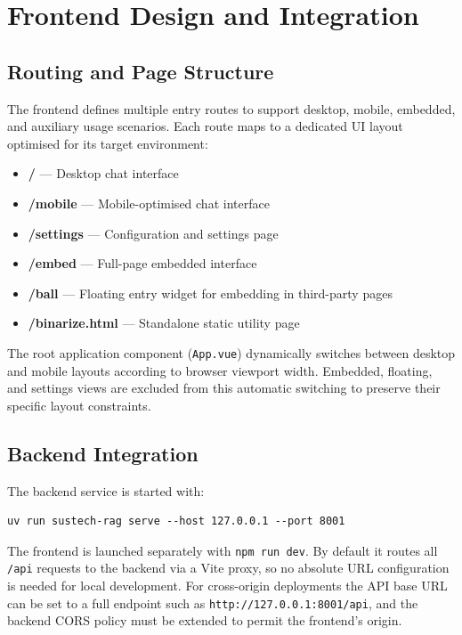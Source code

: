 \chapter{Frontend Design and Integration}
\section{Routing and Page Structure}

The frontend defines multiple entry routes to support desktop, mobile, embedded, and auxiliary usage scenarios. Each route maps to a dedicated UI layout optimised for its target environment:

\begin{itemize}
    \item \textbf{/} — Desktop chat interface
    \item \textbf{/mobile} — Mobile-optimised chat interface
    \item \textbf{/settings} — Configuration and settings page
    \item \textbf{/embed} — Full-page embedded interface
    \item \textbf{/ball} — Floating entry widget for embedding in third-party pages
    \item \textbf{/binarize.html} — Standalone static utility page
\end{itemize}

The root application component (\texttt{App.vue}) dynamically switches between desktop and mobile layouts according to browser viewport width. Embedded, floating, and settings views are excluded from this automatic switching to preserve their specific layout constraints.

\section{Backend Integration}

The backend service is started with:

\begin{verbatim}
uv run sustech-rag serve --host 127.0.0.1 --port 8001
\end{verbatim}

The frontend is launched separately with \texttt{npm run dev}. By default it routes all \texttt{/api} requests to the backend via a Vite proxy, so no absolute URL configuration is needed for local development. For cross-origin deployments the API base URL can be set to a full endpoint such as \texttt{http://127.0.0.1:8001/api}, and the backend CORS policy must be extended to permit the frontend's origin.

